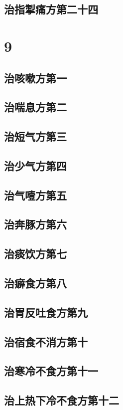 \documentclass[a4paper,12pt,UTF8,twoside]{ctexbook}
\begin{document}
\chapter{治指掣痛方第二十四}

\part{9}
\chapter{治咳嗽方第一}
\chapter{治喘息方第二}
\chapter{治短气方第三}
\chapter{治少气方第四}
\chapter{治气噎方第五}
\chapter{治奔豚方第六}
\chapter{治痰饮方第七}
\chapter{治癖食方第八}
\chapter{治胃反吐食方第九}
\chapter{治宿食不消方第十}
\chapter{治寒冷不食方第十一}
\chapter{治上热下冷不食方第十二}
\end{document}
